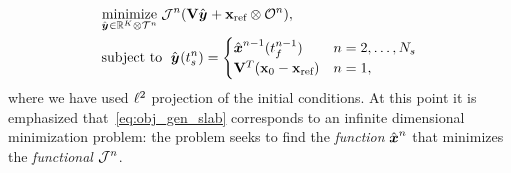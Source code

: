 \begin{equation}\label{eq:obj_gen_slab}
\begin{split}
      & \underset{\hat{\boldsymbol y}^{} \in \mathbb{R}^{K} \otimes \mathcal{T}^{n}
			}{\text{minimize}}\; \mathcal{J}^n(\mathbf {V} \hat{\boldsymbol y}^{} +
			\mathbf{x}_\text{ref} \otimes \mathcal{O}^n), \\ 
      & \text{subject to }\; \hat{\boldsymbol y}^{}(t_s^{n}) =
\begin{cases} \hat{ \boldsymbol x}^{n-1}(t_f^{n-1}) & n = 2,\ldots,N_s \\
\mathbf {V}^T( {{\mathbf{x}}_0} - \mathbf{x}_\text{ref}) & n=1, \end{cases} 
\end{split}
\end{equation}
%
where we have used $\ell^2$ projection of the initial conditions. 
At this point it is emphasized that~\eqref{eq:obj_gen_slab} corresponds to
an infinite dimensional minimization problem: the problem seeks to find the
\textit{function} $\hat{ \boldsymbol x}^n$ that minimizes the \textit{functional}
$\mathcal{J}^{n}$.

